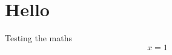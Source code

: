 \documentclass{book}
\begin{document}
\chapter{Hello}
Testing the maths
\[  x= 1  \]
\end{document}
